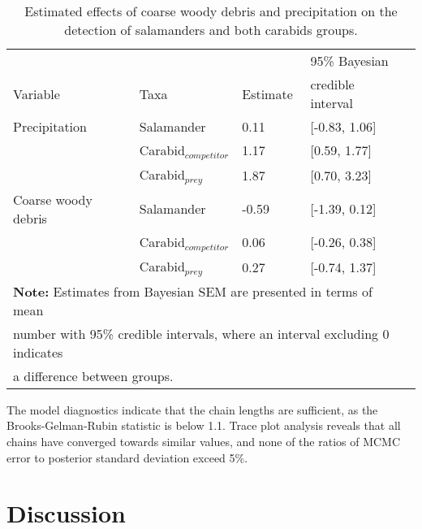 \begin{table}[ht]
  \centering
  \caption[Estimated effects of coarse woody debris and precipitation on the detection of salamanders and both carabids groups]
  {Estimated effects of coarse woody debris and precipitation on the detection of salamanders and both carabids groups.}
  \label{tab:detection}
  \begin{tabular}{lllll} 
      \hline
      &&&95\% Bayesian \\
      Variable & Taxa & Estimate &  credible interval \\ [0.5ex] 
      \hline      
      Precipitation       & Salamander              & \hspace{1mm}0.11 & [-0.83, 1.06] \\ 
                          & Carabid$_{competitor}$  & \hspace{1mm}1.17 & [0.59, 1.77] \\ 
                          & Carabid$_{prey}$        & \hspace{1mm}1.87 & [0.70, 3.23] \\       
      Coarse woody debris & Salamander              & -0.59 & [-1.39, 0.12] \\ 
                          & Carabid$_{competitor}$  & \hspace{1mm}0.06 & [-0.26, 0.38] \\ 
                          & Carabid$_{prey}$        & \hspace{1mm}0.27 & [-0.74, 1.37] \\   

      \hline
      \multicolumn{4}{l}{\textbf{Note:} Estimates from Bayesian SEM are presented in terms of mean} \\
      \multicolumn{4}{l}{number with 95\% credible intervals, where an interval excluding 0 indicates} \\
      \multicolumn{4}{l}{a difference between groups.} \\
  \end{tabular}
\end{table}

The model diagnostics indicate that the chain lengths are sufficient, as the Brooks-Gelman-Rubin statistic is below 1.1.
Trace plot analysis reveals that all chains have converged towards similar values, and none of the ratios of MCMC error to posterior standard deviation exceed 5\%.

\clearpage

\section*{Discussion}
\label{sec:discu1}

